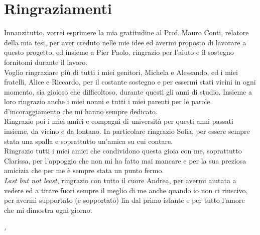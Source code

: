
\cleardoublepage
{}
{}



\bigskip

\begingroup
\let\clearpage\relax
\let\cleardoublepage\relax
\let\cleardoublepage\relax

\chapter*{Ringraziamenti}

\noindent Innanzitutto, vorrei esprimere la mia gratitudine al Prof. Mauro Conti, relatore della mia tesi, per aver creduto nelle mie idee ed avermi proposto di lavorare a questo progetto, ed insieme a Pier Paolo, ringrazio per l'aiuto e il sostegno fornitomi durante il lavoro.\\

\noindent Voglio ringraziare più di tutti i miei genitori, Michela e Alessando, ed i miei fratelli, Alice e Riccardo, per il costante sostegno e per essermi stati vicini in ogni momento, sia gioioso che difficoltoso, durante questi gli anni di studio. Insieme a loro ringrazio anche i miei nonni e tutti i miei parenti per le parole d'incoraggiamento che mi hanno sempre dedicato.\\

\noindent Ringrazio poi i miei amici e compagni di università per questi anni passati insieme, da vicino e da lontano. In particolare ringrazio Sofia, per essere sempre stata una spalla e soprattutto un'amica su cui contare.\\

\noindent Ringrazio tutti i miei amici che condividono questa gioia con me, soprattutto Clarissa, per l'appoggio che non mi ha fatto mai mancare e per la sua preziosa amicizia che per me è sempre stata un punto fermo.\\

\noindent \textit{Last but not least}, ringrazio con tutto il cuore Andrea, per avermi aiutata a vedere ed a tirare fuori sempre il meglio di me anche quando io non ci riuscivo, per avermi supportato (e sopportato) fin dal primo istante e per tutto l'amore che mi dimostra ogni giorno.\\
\bigskip

\noindent\textit{\myLocation, \myTime}
\hfill \myName

\endgroup

